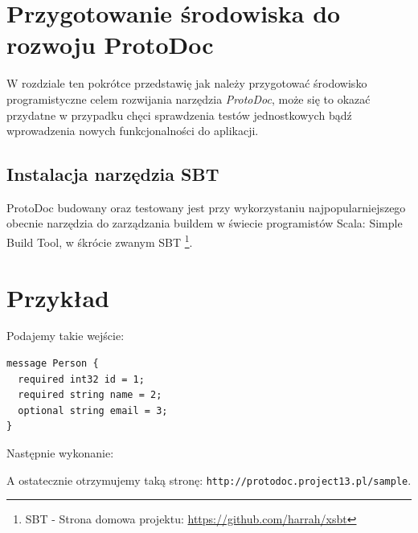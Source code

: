 \documentclass[pdflatex,11pt]{aghdpl}
\begin{document}
\chapter{Przygotowanie środowiska do rozwoju ProtoDoc}
W rozdziale ten pokrótce przedstawię jak należy przygotować środowisko programistyczne celem rozwijania narzędzia \textit{ProtoDoc},
może się to okazać przydatne w przypadku chęci sprawdzenia testów jednostkowych bądź wprowadzenia nowych funkcjonalności do aplikacji.

\section{}

\section{Instalacja narzędzia SBT}
ProtoDoc budowany oraz testowany jest przy wykorzystaniu najpopularniejszego obecnie narzędzia do zarządzania buildem w świecie programistów Scala:
Simple Build Tool, w śkrócie zwanym SBT \footnote{SBT - Strona domowa projektu: \href{https://github.com/harrah/xsbt}{https://github.com/harrah/xsbt}}.



\chapter{Przykład}
Podajemy takie wejście:
\begin{verbatim}
message Person {
  required int32 id = 1;
  required string name = 2;
  optional string email = 3;
}
\end{verbatim}

Następnie wykonanie:

A ostatecznie otrzymujemy taką stronę: \verb|http://protodoc.project13.pl/sample|.




\appendix





\end{document}
